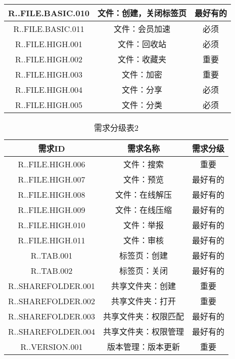 \begin{table}[htbp]
\begin{tabular}{|c|c|c|}
    \hline
    R..FILE.BASIC.010 & 文件：创建，关闭标签页 & 最好有的 \\
    \hline
    R..FILE.BASIC.011 & 文件：会员加速 & 必须 \\
    \hline
    R..FILE.HIGH.001 & 文件：回收站 & 必须 \\
    \hline
    R..FILE.HIGH.002 & 文件：收藏夹 & 重要 \\
    \hline
    R..FILE.HIGH.003 & 文件：加密 & 重要 \\
    \hline
    R..FILE.HIGH.004 & 文件：分享 & 必须 \\
    \hline
    R..FILE.HIGH.005 & 文件：分类 & 必须 \\
    \hline 
\end{tabular}
\end{table}
\begin{table}[htbp]
\centering
\caption{需求分级表2} \label{tab:abbr}
\begin{tabular}{|c|c|c|}
    \hline
    需求ID & 需求名称 & 需求分级 \\
    \hline
    R..FILE.HIGH.006 & 文件：搜索 & 重要 \\
    \hline
    R..FILE.HIGH.007 & 文件：预览 & 最好有的 \\
    \hline
    R..FILE.HIGH.008 & 文件：在线解压 & 最好有的 \\
    \hline
    R..FILE.HIGH.009 & 文件：在线压缩 & 最好有的 \\
    \hline
    R..FILE.HIGH.010 & 文件：举报 & 最好有的 \\
    \hline
    R..FILE.HIGH.011 & 文件：审核 & 最好有的 \\
    \hline
    R..TAB.001 & 标签页：创建 & 最好有的 \\
    \hline
    R..TAB.002 & 标签页：关闭 & 最好有的 \\
    \hline
    R..SHAREFOLDER.001 & 共享文件夹：创建 & 重要 \\
    \hline
    R..SHAREFOLDER.002 & 共享文件夹：打开 & 重要 \\
    \hline
    R..SHAREFOLDER.003 & 共享文件夹：权限匹配 & 最好有的 \\
    \hline
    R..SHAREFOLDER.004 & 共享文件夹：权限管理 & 最好有的 \\
    \hline
    R..VERSION.001 & 版本管理：版本更新 & 重要 \\
    \hline
\end{tabular}
\end{table}
